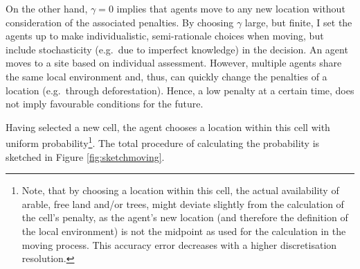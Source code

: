 On the other hand, $\gamma=0$ implies that agents move to any new location without consideration of the associated penalties.
By choosing $\gamma$ large, but finite, I set the agents up to make individualistic, semi-rationale choices when moving, but include stochasticity (e.g.\ due to imperfect knowledge) in the decision.
An agent moves to a site based on individual assessment.
However, multiple agents share the same local environment and, thus, can quickly change the penalties of a location (e.g.\ through deforestation). 
Hence, a low penalty at a certain time, does not imply favourable conditions for the future.

Having selected a new cell, the agent chooses a location within this cell with uniform probability\footnote{Note, that by choosing a location within this cell, the actual availability of arable, free land and/or trees, might deviate slightly from the calculation of the cell's penalty, as the agent's new location (and therefore the definition of the local environment) is not the midpoint as used for the calculation in the moving process.
This accuracy error decreases with a higher discretisation resolution.}.
The total procedure of calculating the probability is sketched in Figure \ref{fig:sketchmoving}.

